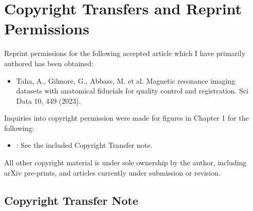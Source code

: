 \chapter{Copyright Transfers and Reprint Permissions}\label{app:copyright}

Reprint permissions for the following accepted article which I have primarily authored has
been obtained:
\begin{itemize}
	\item Taha, A., Gilmore, G., Abbass, M. et al. Magnetic resonance imaging datasets with anatomical fiducials for quality control and registration. Sci Data 10, 449 (2023).
\end{itemize}

Inquiries into copyright permission were made for figures in Chapter 1 for the following:
\begin{itemize}
	\item \cite{Horn2018-qq}: See the included Copyright Transfer note.
\end{itemize}

All other copyright material is under sole ownership by the author, including arXiv pre-prints, and articles currently under submission or revision.
\newpage
\section{Copyright Transfer Note \cite{Horn2018-qq}}

